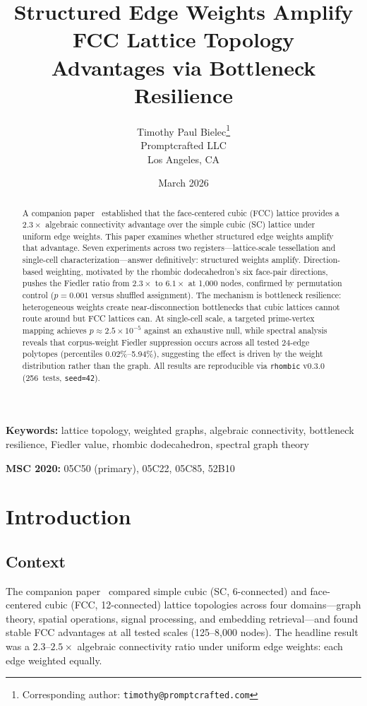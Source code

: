 \documentclass[11pt]{article}
\title{%
  Structured Edge Weights Amplify FCC Lattice Topology\\
  Advantages via Bottleneck Resilience%
}
\author{%
  Timothy Paul Bielec\thanks{Corresponding author: \texttt{timothy@promptcrafted.com}}\\
  Promptcrafted LLC\\
  Los Angeles, CA
}
\date{March 2026}
\begin{document}
\maketitle

\begin{abstract}
A companion paper~\cite{bielec2026shape} established that the
face-centered cubic (FCC) lattice provides a $2.3\times$ algebraic
connectivity advantage over the simple cubic (SC) lattice under
uniform edge weights. This paper examines whether structured edge
weights amplify that advantage. Seven experiments
across two registers---lattice-scale tessellation and single-cell
characterization---answer definitively: structured weights amplify.
Direction-based weighting, motivated by the rhombic dodecahedron's
six face-pair directions, pushes the Fiedler ratio from $2.3\times$
to $6.1\times$ at 1{,}000 nodes, confirmed by permutation control
($p = 0.001$ versus shuffled assignment). The mechanism is bottleneck
resilience: heterogeneous weights create near-disconnection
bottlenecks that cubic lattices cannot route around but FCC lattices
can. At single-cell scale, a targeted prime-vertex mapping achieves
$p \approx 2.5 \times 10^{-5}$ against an exhaustive null, while spectral analysis
reveals that corpus-weight Fiedler suppression occurs across all
tested 24-edge polytopes (percentiles 0.02\%--5.94\%), suggesting the
effect is driven by the weight distribution rather than the graph. All results are reproducible via \texttt{rhombic} v0.3.0
(256~tests, \texttt{seed=42}).
\end{abstract}

\noindent\textbf{Keywords:} lattice topology, weighted graphs,
algebraic connectivity, bottleneck resilience, Fiedler value,
rhombic dodecahedron, spectral graph theory

\smallskip\noindent\textbf{MSC 2020:} 05C50 (primary), 05C22, 05C85, 52B10

\section{Introduction}
\label{sec:intro}

\subsection{Context}

The companion paper~\cite{bielec2026shape} compared simple cubic
(SC, 6-connected) and face-centered cubic (FCC, 12-connected)
lattice topologies across four domains---graph theory, spatial
operations, signal processing, and embedding retrieval---and found
stable FCC advantages at all tested scales (125--8{,}000 nodes).
The headline result was a $2.3$--$2.5\times$ algebraic connectivity
ratio under uniform edge weights: each edge weighted equally.
\end{document}
